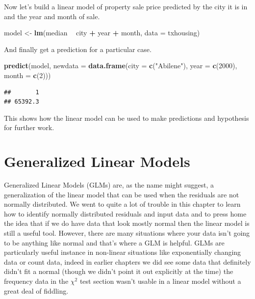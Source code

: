 \documentclass[
]{book}
\newenvironment{Shaded}{\begin{snugshade}}{\end{snugshade}}
\newcommand{\DataTypeTok}[1]{\textcolor[rgb]{0.13,0.29,0.53}{#1}}
\newcommand{\DecValTok}[1]{\textcolor[rgb]{0.00,0.00,0.81}{#1}}
\newcommand{\KeywordTok}[1]{\textcolor[rgb]{0.13,0.29,0.53}{\textbf{#1}}}
\newcommand{\NormalTok}[1]{#1}
\newcommand{\OperatorTok}[1]{\textcolor[rgb]{0.81,0.36,0.00}{\textbf{#1}}}
\newcommand{\StringTok}[1]{\textcolor[rgb]{0.31,0.60,0.02}{#1}}
\begin{document}
Now let's build a linear model of property sale price predicted by the city it is in and the year and month of sale.

\begin{Shaded}
\begin{Highlighting}[]
\NormalTok{model <-}\StringTok{ }\KeywordTok{lm}\NormalTok{(median }\OperatorTok{~}\StringTok{ }\NormalTok{city }\OperatorTok{+}\StringTok{ }\NormalTok{year }\OperatorTok{+}\StringTok{ }\NormalTok{month, }\DataTypeTok{data =}\NormalTok{ txhousing)}
\end{Highlighting}
\end{Shaded}

And finally get a prediction for a particular case.

\begin{Shaded}
\begin{Highlighting}[]
\KeywordTok{predict}\NormalTok{(model, }\DataTypeTok{newdata =} \KeywordTok{data.frame}\NormalTok{(}\DataTypeTok{city =} \KeywordTok{c}\NormalTok{(}\StringTok{"Abilene"}\NormalTok{), }\DataTypeTok{year =} \KeywordTok{c}\NormalTok{(}\DecValTok{2000}\NormalTok{), }\DataTypeTok{month =} \KeywordTok{c}\NormalTok{(}\DecValTok{2}\NormalTok{)))}
\end{Highlighting}
\end{Shaded}

\begin{verbatim}
##       1 
## 65392.3
\end{verbatim}

This shows how the linear model can be used to make predictions and hypothesis for further work.

\hypertarget{generalized-linear-models}{%
\section{Generalized Linear Models}\label{generalized-linear-models}}

Generalized Linear Models (GLMs) are, as the name might suggest, a generalization of the linear model that can be used when the residuals are not normally distributed. We went to quite a lot of trouble in this chapter to learn how to identify normally distributed residuals and input data and to press home the idea that if we do have data that look mostly normal then the linear model is still a useful tool. However, there are many situations where your data isn't going to be anything like normal and that's where a GLM is helpful. GLMs are particularly useful instance in non-linear situations like exponentially changing data or count data, indeed in earlier chapters we did see some data that definitely didn't fit a normal (though we didn't point it out explicitly at the time) the frequency data in the \(\chi^2\) test section wasn't usable in a linear model without a great deal of fiddling.
\end{document}
